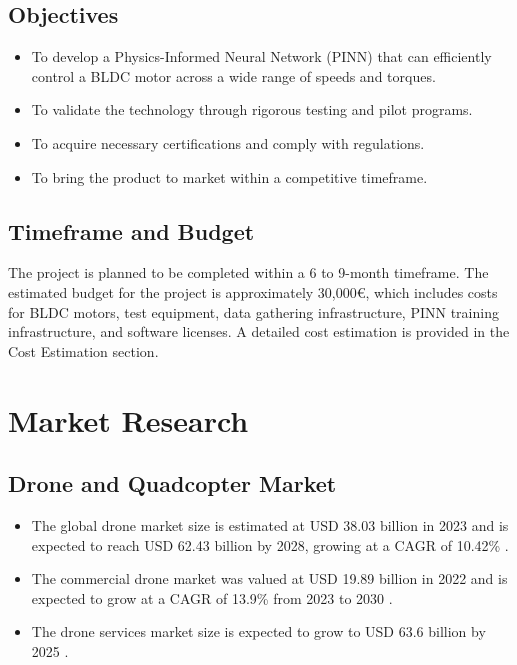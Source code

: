 \documentclass[12pt]{article}
\begin{document}
	\subsection{Objectives}
	\begin{itemize}
		\item To develop a Physics-Informed Neural Network (PINN) that can efficiently control a BLDC motor across a wide range of speeds and torques.
		\item To validate the technology through rigorous testing and pilot programs.
		\item To acquire necessary certifications and comply with regulations.
		\item To bring the product to market within a competitive timeframe.
	\end{itemize}
	
	\subsection{Timeframe and Budget}
	The project is planned to be completed within a 6 to 9-month timeframe. The estimated budget for the project is approximately 30,000€, which includes costs for BLDC motors, test equipment, data gathering infrastructure, PINN training infrastructure, and software licenses. A detailed cost estimation is provided in the Cost Estimation section.
			
	\section{Market Research}
	\subsection{Drone and Quadcopter Market}
		\begin{itemize}
			\item The global drone market size is estimated at USD 38.03 billion in 2023 and is expected to reach USD 62.43 billion by 2028, growing at a CAGR of 10.42\% \cite{mordorintelligence}.
			\item The commercial drone market was valued at USD 19.89 billion in 2022 and is expected to grow at a CAGR of 13.9\% from 2023 to 2030 \cite{grandviewresearch}.
			\item The drone services market size is expected to grow to USD 63.6 billion by 2025 \cite{insiderintelligence}.
		\end{itemize}
	
\end{document}
